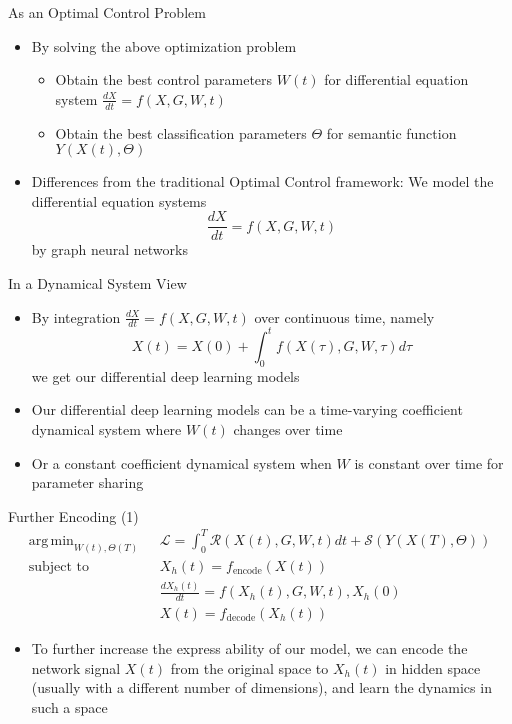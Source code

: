 \documentclass{beamer}
\DeclareMathOperator*{\argmin}{arg\,min}
\begin{document}
\begin{frame}{As an Optimal Control Problem}
\begin{itemize}
\item By solving the above optimization problem
\begin{itemize}
\item Obtain the best control parameters $W(t)$ for differential equation system $\frac{dX}{dt}=f(X,G,W,t)$
\item Obtain the best classification parameters $\Theta$ for semantic function $Y(X(t),\Theta)$
\end{itemize}
\item Differences from the traditional Optimal Control framework: We model the differential equation systems\[
\frac{dX}{dt}=f(X,G,W,t)
\]by graph neural networks
\end{itemize}
\end{frame}

\begin{frame}{In a Dynamical System View}
\begin{itemize}
\item By integration $\frac{dX}{dt}=f(X,G,W,t)$ over continuous time, namely\[
X(t)=X(0)+\int_0^tf(X(\tau),G,W,\tau)d\tau
\]we get our differential deep learning models
\item Our differential deep learning models can be a time-varying coefficient dynamical system where $W(t)$ changes over time
\item Or a constant coefficient dynamical system when $W$ is constant over time for parameter sharing
\end{itemize}
\end{frame}

\begin{frame}{Further Encoding (1)}
\[
\begin{split}
\argmin_{W(t),\Theta(T)}\text{ }&\mathcal{L}=\int_0^T\mathcal{R}\left(X(t),G,W,t\right)dt+\mathcal{S}\left(Y(X(T),\Theta)\right)\\
\text{subject to }&X_h(t)=f_\text{encode}(X(t))\\
&\frac{dX_h(t)}{dt}=f(X_h(t),G,W,t),X_h(0)\\
&X(t)=f_\text{decode}(X_h(t))
\end{split}
\]
\begin{itemize}
\item To further increase the express ability of our model, we can encode the network signal $X(t)$ from the original space to $X_h(t)$ in hidden space (usually with a different number of dimensions), and learn the dynamics in such a space
\end{itemize}
\end{frame}
\end{document}
